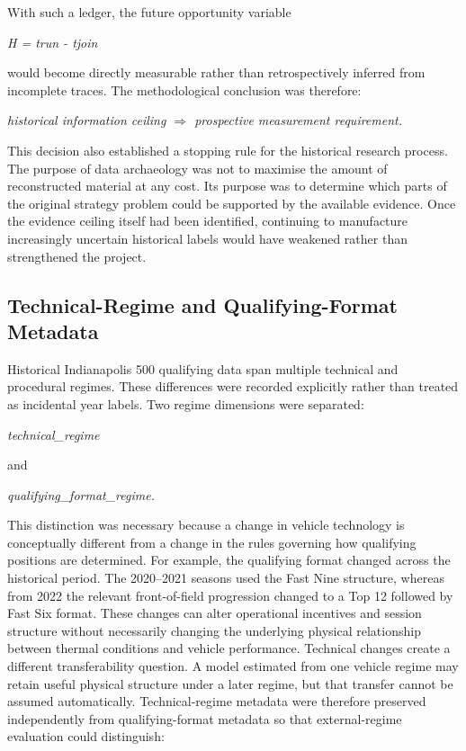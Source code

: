 With such a ledger, the future opportunity variable

\begin{center}\textit{H = trun - tjoin}\end{center}

would become directly measurable rather than retrospectively inferred from incomplete traces. The methodological conclusion was therefore:

\begin{center}\textit{historical information ceiling \ensuremath{\Rightarrow} prospective measurement requirement.}\end{center}

This decision also established a stopping rule for the historical research process. The purpose of data archaeology was not to maximise the amount of reconstructed material at any cost. Its purpose was to determine which parts of the original strategy problem could be supported by the available evidence. Once the evidence ceiling itself had been identified, continuing to manufacture increasingly uncertain historical labels would have weakened rather than strengthened the project.

\subsection{Technical-Regime and Qualifying-Format Metadata}
Historical Indianapolis 500 qualifying data span multiple technical and procedural regimes. These differences were recorded explicitly rather than treated as incidental year labels. Two regime dimensions were separated:

\begin{center}\textit{technical\_regime}\end{center}

and

\begin{center}\textit{qualifying\_format\_regime.}\end{center}

This distinction was necessary because a change in vehicle technology is conceptually different from a change in the rules governing how qualifying positions are determined. For example, the qualifying format changed across the historical period. The 2020--2021 seasons used the Fast Nine structure, whereas from 2022 the relevant front-of-field progression changed to a Top 12 followed by Fast Six format. These changes can alter operational incentives and session structure without necessarily changing the underlying physical relationship between thermal conditions and vehicle performance. Technical changes create a different transferability question. A model estimated from one vehicle regime may retain useful physical structure under a later regime, but that transfer cannot be assumed automatically. Technical-regime metadata were therefore preserved independently from qualifying-format metadata so that external-regime evaluation could distinguish:

